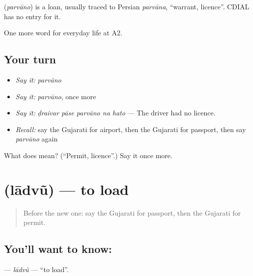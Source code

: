 \begin{cousinweb}
\textbf{} (\emph{parvāno}) is a loan, usually traced to Persian \emph{parvāna}, \textquotedblleft{}warrant, licence\textquotedblright{}. CDIAL has no entry for it.
\end{cousinweb}

\begin{grammarlens}[title={What you've built}]
One more word for everyday life at A2.
\end{grammarlens}

\subsection*{Your turn}
\begin{itemize}
\raggedright
  \item \emph{Say it:} \emph{parvāno}
  \item \emph{Say it:} \emph{parvāno}, once more
  \item \emph{Say it:} \emph{ḍraivar pāse parvāno na hato} — The driver had no licence.
  \item \emph{Recall:} say the Gujarati for airport, then the Gujarati for passport, then say \emph{parvāno} again
\end{itemize}

\begin{tcolorbox}[breakable,colback=teal!4,colframe=teal!35!black,title={Before you move on}]
What does  mean? (\textquotedblleft{}Permit, licence\textquotedblright{}.) Say it once more.
\end{tcolorbox}
\section[\texorpdfstring{\gu{લાદવું} (lādvũ)}{લાદવું (lādvũ)}]{ (lādvũ) — to load}

\label{lesson:GU-C210-ladvu}



\begin{quote}
Before the new one: say the Gujarati for passport, then the Gujarati for permit.
\end{quote}

\subsection*{You'll want to know: }
\textbf{} — \emph{lādvũ} — \textquotedblleft{}to load\textquotedblright{}.

